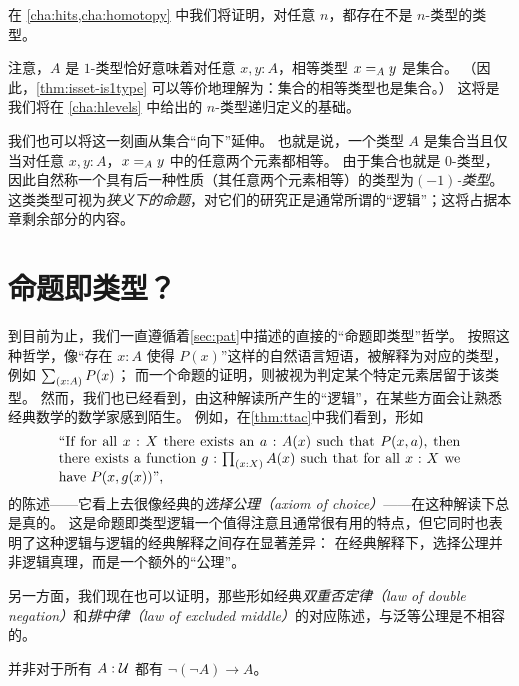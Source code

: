 在 \cref{cha:hits,cha:homotopy} 中我们将证明，对任意 $n$，都存在不是 $n$-类型的类型。

注意，$A$ 是 $1$-类型恰好意味着对任意 $x,y:A$，相等类型 $\id[A]xy$ 是集合。
（因此，\cref{thm:isset-is1type} 可以等价地理解为：集合的相等类型也是集合。）
这将是我们将在 \cref{cha:hlevels} 中给出的 $n$-类型递归定义的基础。

我们也可以将这一刻画从集合``向下''延伸。
也就是说，一个类型 $A$ 是集合当且仅当对任意 $x,y:A$，$\id[A]xy$ 中的任意两个元素都相等。
由于集合也就是 $0$-类型，因此自然称一个具有后一种性质（其任意两个元素相等）的类型为\emph{$(-1)$-类型}。
这类类型可视为\emph{狭义下的命题}，对它们的研究正是通常所谓的``逻辑''；这将占据本章剩余部分的内容。

%
%

\section{命题即类型？}
\label{subsec:pat?}

%
%
%
到目前为止，我们一直遵循着\cref{sec:pat}中描述的直接的``命题即类型''哲学。
按照这种哲学，像``存在 $x:A$ 使得 $P(x)$''这样的自然语言短语，被解释为对应的类型，例如 $\sm{x:A} P(x)$；
而一个命题的证明，则被视为判定某个特定元素居留于该类型。
然而，我们也已经看到，由这种解读所产生的``逻辑''，在某些方面会让熟悉经典数学的数学家感到陌生。
例如，在\cref{thm:ttac}中我们看到，形如
%
\begin{equation}\label{eq:english-ac}
  \parbox{\textwidth-2cm}{``If for all $x:X$ there exists an $a:A(x)$ such that $P(x,a)$, then there exists a function $g:\prd{x:X} A(x)$ such that for all $x:X$ we have $P(x,g(x))$'',}
\end{equation}
的陈述——它看上去很像经典的\emph{选择公理（axiom of choice）}——在这种解读下总是真的。
这是命题即类型逻辑一个值得注意且通常很有用的特点，但它同时也表明了这种逻辑与逻辑的经典解释之间存在显著差异：
在经典解释下，选择公理并非逻辑真理，而是一个额外的``公理''。

另一方面，我们现在也可以证明，那些形如经典\emph{双重否定律（law of double negation）}和\emph{排中律（law of excluded middle）}的对应陈述，与泛等公理是不相容的。
%

\begin{thm}\label{thm:not-dneg}
  并非对于所有 $A:\UU$ 都有 $\neg(\neg A) \to A$。
\end{thm}

